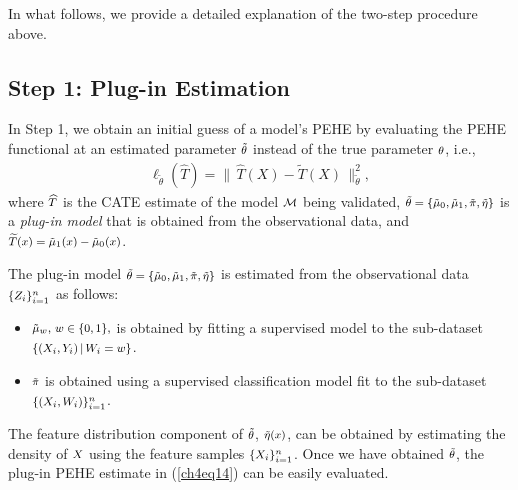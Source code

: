 \documentclass [PhD] {uclathes}
\begin{document}
In what follows, we provide a detailed explanation of the two-step procedure above.
 
\subsection{Step 1: Plug-in Estimation}
\label{ch4sec451} 
In Step 1, we obtain an initial guess of a model's PEHE by evaluating the PEHE functional at an estimated parameter $\mbox{\footnotesize $\tilde{\theta}$}$ instead of the true parameter $\mbox{\footnotesize $\theta$}$, i.e., 
\begin{align}
\boldsymbol{\ell}_{\tilde{\theta}}(\widehat{T}) = \big\|\,\widehat{T}(X) - \widetilde{T}(X)\,\big\|^2_{\tilde{\theta}},
\label{ch4eq14} 
\end{align}
where $\mbox{\footnotesize $\widehat{T}$}$ is the CATE estimate of the model $\mbox{\footnotesize $\mathcal{M}$}$ being validated, $\mbox{\footnotesize $\tilde{\theta} = \{\tilde{\mu}_0,\tilde{\mu}_1,\tilde{\pi},\tilde{\eta}\}$}$ is a {\it plug-in model} that is obtained from the observational data, and $\mbox{\footnotesize $\widetilde{T}(x) = \tilde{\mu}_1(x)-\tilde{\mu}_0(x)$}$. 

The plug-in model $\mbox{\footnotesize $\tilde{\theta} = \{\tilde{\mu}_0,\tilde{\mu}_1,\tilde{\pi},\tilde{\eta}\}$}$ is estimated from the observational data $\mbox{\footnotesize $\{Z_i\}^n_{i=1}$}$ as follows: 
\begin{itemize}
\item $\mbox{\footnotesize $\tilde{\mu}_w,\,w \in \{0,1\},$}$ is obtained by fitting a supervised model to the sub-dataset $\mbox{\footnotesize $\{(X_i,Y_i)\,|\,W_i = w\}$}$. 
\item $\mbox{\footnotesize $\tilde{\pi}$}$ is obtained using a supervised classification model fit to the sub-dataset $\mbox{\footnotesize $\{(X_i,W_i)\}_{i=1}^n$}$. 
\end{itemize}
The feature distribution component of $\mbox{\footnotesize $\tilde{\theta}$}$, $\mbox{\footnotesize $\tilde{\eta}(x)$}$, can be obtained by estimating the density of $\mbox{\footnotesize $X$}$ using the feature samples $\mbox{\footnotesize $\{X_i\}^n_{i=1}$}$. Once we have obtained $\mbox{\footnotesize $\tilde{\theta}$}$, the plug-in PEHE estimate in (\ref{ch4eq14}) can be easily evaluated.  
\end{document}
